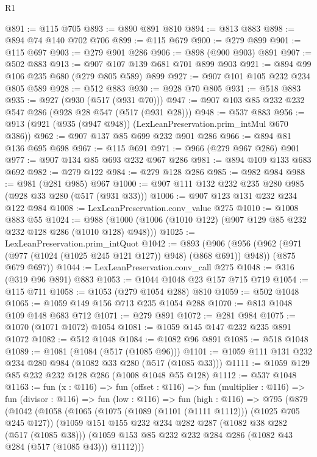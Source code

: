 \begin{lexlean}{R1}
\begin{coremodule}
{{{{{{{@891 := @115 @705
@893 := @890 @891 @810
@894 := @813 @883
@898 := @894 @74 @140 @702 @706
@899 := @115 @679
@900 := @279 @899
@901 := @115 @697
@903 := @279 @901 @286
@906 := @898 (@900 @903) @891
@907 := @502 @883
@913 := @907 @107 @139 @681 @701 @899 @903
@921 := @894 @99 @106 @235 @680 (@279 @805 @589) @899
@927 := @907 @101 @105 @232 @234 @805 @589
@928 := @512 @883
@930 := @928 @70 @805
@931 := @518 @883
@935 := @927 (@930 (@517 (@931 @70)))
@947 := @907 @103 @85 @232 @232 @547 @286 (@928 @28 @547 (@517 (@931 @28)))
@948 := @537 @883
@956 := @913 (@921 (@935 (@947 @948)) (LexLeanPreservation.prim_intMul @670 @386))
@962 := @907 @137 @85 @699 @232 @901 @286
@966 := @894 @81 @136 @695 @698
@967 := @115 @691
@971 := @966 (@279 @967 @286) @901
@977 := @907 @134 @85 @693 @232 @967 @286
@981 := @894 @109 @133 @683 @692
@982 := @279 @122
@984 := @279 @128 @286
@985 := @982 @984
@988 := @981 (@281 @985) @967
@1000 := @907 @111 @132 @232 @235 @280 @985 (@928 @33 @280 (@517 (@931 @33)))
@1006 := @907 @123 @131 @232 @234 @122 @984
@1008 := LexLeanPreservation.conv_value @275
@1010 := @1008 @883 @55
@1024 := @988 (@1000 (@1006 (@1010 @122) (@907 @129 @85 @232 @232 @128 @286 (@1010 @128) @948)))
@1025 := LexLeanPreservation.prim_intQuot
@1042 := @893
    (@906
      (@956 (@962 (@971 (@977 (@1024 (@1025 @245 @121 @127)) @948) (@868 @691)) @948))
      (@875 @679 @697))
@1044 := LexLeanPreservation.conv_call @275
@1048 := @316 (@319 @96 @891) @883
@1053 := @1044 @1048 @23 @157 @715 @719
@1054 := @115 @711
@1058 := @1053 (@279 @1054 @288) @810
@1059 := @502 @1048
@1065 := @1059 @149 @156 @713 @235 @1054 @288
@1070 := @813 @1048 @109 @148 @683 @712
@1071 := @279 @891
@1072 := @281 @984
@1075 := @1070 (@1071 @1072) @1054
@1081 := @1059 @145 @147 @232 @235 @891 @1072
@1082 := @512 @1048
@1084 := @1082 @96 @891
@1085 := @518 @1048
@1089 := @1081 (@1084 (@517 (@1085 @96)))
@1101 := @1059 @111 @131 @232 @234 @280 @984 (@1082 @33 @280 (@517 (@1085 @33)))
@1111 := @1059 @129 @85 @232 @232 @128 @286 (@1008 @1048 @55 @128)
@1112 := @537 @1048
@1163 := fun (x : @116) =>
  fun (offset : @116) =>
  fun (multiplier : @116) =>
  fun (divisor : @116) =>
  fun (low : @116) =>
  fun (high : @116) =>
  @795
    (@879
      (@1042
        (@1058
          (@1065
            (@1075 (@1089 (@1101 (@1111 @1112))) (@1025 @705 @245 @127))
            (@1059
              @151
              @155
              @232
              @234
              @282
              @287
              (@1082 @38 @282 (@517 (@1085 @38)))
              (@1059 @153 @85 @232 @232 @284 @286 (@1082 @43 @284 (@517 (@1085 @43))) @1112)))
}}}}}}}
\end{coremodule}
\end{lexlean}
